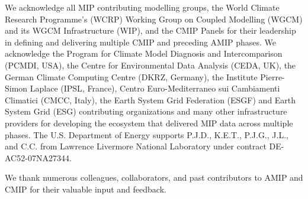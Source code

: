 \documentclass[gmd, preprint]{copernicus}
\begin{document}
\begin{acknowledgements}

We acknowledge all MIP contributing modelling groups, the World Climate Research Programme's (WCRP) Working Group on Coupled Modelling (WGCM) and its WGCM Infrastructure (WIP), and the CMIP Panels for their leadership in defining and delivering multiple CMIP and preceding AMIP phases. We acknowledge the Program for Climate Model Diagnosis and Intercomparison (PCMDI, USA), the Centre for Environmental Data Analysis (CEDA, UK), the German Climate Computing Centre (DKRZ, Germany), the Institute Pierre-Simon Laplace (IPSL, France), Centro Euro-Mediterraneo sui Cambiamenti Climatici (CMCC, Italy), the Earth System Grid Federation (ESGF) and Earth System Grid (ESG) contributing organizations and many other infrastructure providers for developing the ecosystem that delivered MIP data across multiple phases. The U.S. Department of Energy supports P.J.D., K.E.T., P.J.G., J.L., and C.C. from Lawrence Livermore National Laboratory under contract DE-AC52-07NA27344.

We thank numerous colleagues, collaborators, and past contributors to AMIP and CMIP for their valuable input and feedback.

\end{acknowledgements}









\end{document}
